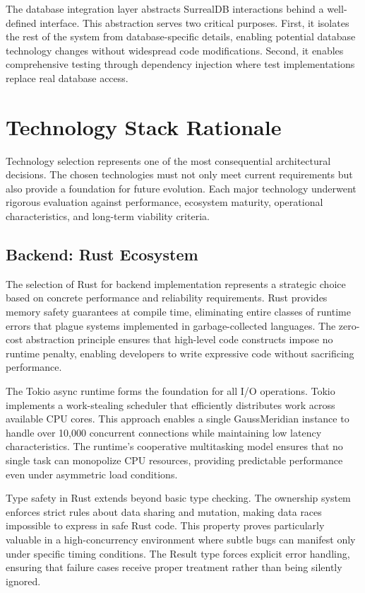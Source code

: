 \documentclass[12pt,a4paper,twoside]{report}
\begin{document}
The database integration layer abstracts SurrealDB interactions behind a well-defined interface. This abstraction serves two critical purposes. First, it isolates the rest of the system from database-specific details, enabling potential database technology changes without widespread code modifications. Second, it enables comprehensive testing through dependency injection where test implementations replace real database access.

\section{Technology Stack Rationale}

Technology selection represents one of the most consequential architectural decisions. The chosen technologies must not only meet current requirements but also provide a foundation for future evolution. Each major technology underwent rigorous evaluation against performance, ecosystem maturity, operational characteristics, and long-term viability criteria.

\subsection{Backend: Rust Ecosystem}

The selection of Rust for backend implementation represents a strategic choice based on concrete performance and reliability requirements. Rust provides memory safety guarantees at compile time, eliminating entire classes of runtime errors that plague systems implemented in garbage-collected languages. The zero-cost abstraction principle ensures that high-level code constructs impose no runtime penalty, enabling developers to write expressive code without sacrificing performance.

The Tokio async runtime forms the foundation for all I/O operations. Tokio implements a work-stealing scheduler that efficiently distributes work across available CPU cores. This approach enables a single GaussMeridian instance to handle over 10,000 concurrent connections while maintaining low latency characteristics. The runtime's cooperative multitasking model ensures that no single task can monopolize CPU resources, providing predictable performance even under asymmetric load conditions.

Type safety in Rust extends beyond basic type checking. The ownership system enforces strict rules about data sharing and mutation, making data races impossible to express in safe Rust code. This property proves particularly valuable in a high-concurrency environment where subtle bugs can manifest only under specific timing conditions. The Result type forces explicit error handling, ensuring that failure cases receive proper treatment rather than being silently ignored.
\end{document}
